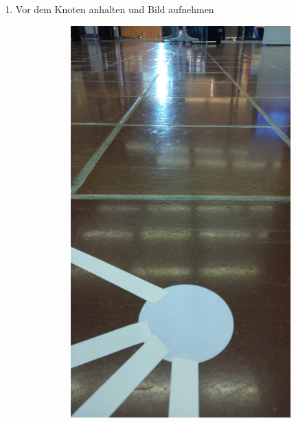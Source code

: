 \begin{enumerate}
    \item Vor dem Knoten anhalten und Bild aufnehmen


    \begin{figure}[H]
        \centering
        \begin{subfigure}{0.25\textwidth}
        \includegraphics[width=0.95\linewidth]{assets/informatik-prototyp/opencv/angle_detection/image_taken_by_pi_camer_before_node.jpg}

\end{subfigure}
\end{figure}
\end{enumerate}
